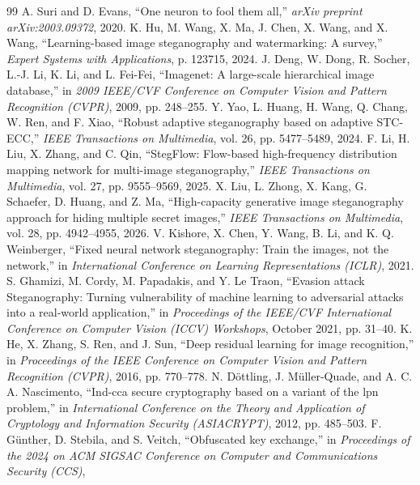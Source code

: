 \begin{thebibliography}{99}
A. Suri and D. Evans,
``One neuron to fool them all,''
\emph{arXiv preprint arXiv:2003.09372}, 2020.
K. Hu, M. Wang, X. Ma, J. Chen, X. Wang, and X. Wang,
``Learning-based image steganography and watermarking: A survey,''
\emph{Expert Systems with Applications}, p. 123715, 2024.
J. Deng, W. Dong, R. Socher, L.-J. Li, K. Li, and L. Fei-Fei,
``Imagenet: A large-scale hierarchical image database,''
in \emph{2009 IEEE/CVF Conference on Computer Vision and Pattern Recognition (CVPR)},
2009, pp. 248--255.
Y. Yao, L. Huang, H. Wang, Q. Chang, W. Ren, and F. Xiao,
``Robust adaptive steganography based on adaptive STC-ECC,''
\emph{IEEE Transactions on Multimedia},
vol. 26, pp. 5477--5489, 2024.
F. Li, H. Liu, X. Zhang, and C. Qin,
``StegFlow: Flow-based high-frequency distribution mapping network for multi-image steganography,''
\emph{IEEE Transactions on Multimedia},
vol. 27, pp. 9555--9569, 2025.
X. Liu, L. Zhong, X. Kang, G. Schaefer, D. Huang, and Z. Ma,
``High-capacity generative image steganography approach for hiding multiple secret images,''
\emph{IEEE Transactions on Multimedia},
vol. 28, pp. 4942--4955, 2026.
V. Kishore, X. Chen, Y. Wang, B. Li, and K. Q. Weinberger,
``Fixed neural network steganography: Train the images, not the network,''
in \emph{International Conference on Learning Representations (ICLR)}, 2021.
S. Ghamizi, M. Cordy, M. Papadakis, and Y. Le Traon,
``Evasion attack Steganography: Turning vulnerability of machine learning to adversarial attacks into a real-world application,''
in \emph{Proceedings of the IEEE/CVF International Conference on Computer Vision (ICCV) Workshops},
October 2021, pp. 31--40.
K. He, X. Zhang, S. Ren, and J. Sun,
``Deep residual learning for image recognition,''
in \emph{Proceedings of the IEEE Conference on Computer Vision and Pattern Recognition (CVPR)},
2016, pp. 770--778.
N. Döttling, J. Müller-Quade, and A. C. A. Nascimento,
``Ind-cca secure cryptography based on a variant of the lpn problem,''
in \emph{International Conference on the Theory and Application of Cryptology and Information Security (ASIACRYPT)},
2012, pp. 485--503.
F. Günther, D. Stebila, and S. Veitch,
``Obfuscated key exchange,''
in \emph{Proceedings of the 2024 on ACM SIGSAC Conference on Computer and Communications Security (CCS)},

\end{thebibliography}

